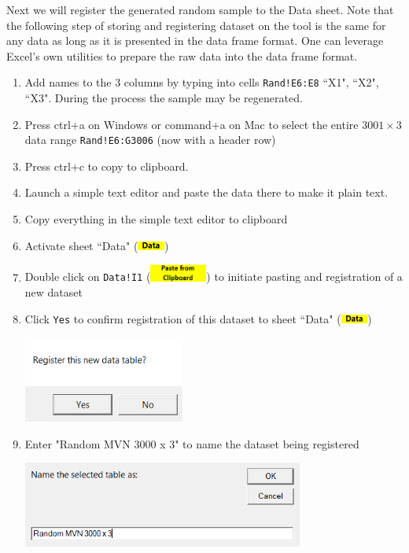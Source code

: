 \documentclass[article]{jss}
\newcommand{\shtData}{``Data" (\includegraphics[height=8pt, keepaspectratio=true]{DataSheetTab_png}) }
\begin{document}
        Next we will register the generated random sample to the Data sheet. Note that the following step of storing and registering dataset on the tool is the same for any data as long as it is presented in the data frame format. One can leverage Excel's own utilities to prepare the raw data into the data frame format.
        \begin{enumerate}
        \item Add names to the 3 columns by typing into cells \texttt{Rand!E6:E8} ``X1", ``X2", ``X3". During the process the sample may be regenerated.
        \item Press ctrl+a on Windows or command+a on Mac to select the entire $3001\times 3$ data range \texttt{Rand!E6:G3006} (now with a header row)
        \item Press ctrl+c to copy to clipboard.
        \item Launch a simple text editor and paste the data there to make it plain text.
        \item Copy everything in the simple text editor to clipboard
        \item Activate sheet \shtData
        \item Double click on \texttt{Data!I1} (\includegraphics[height=16pt,keepaspectratio=true]{DataSheet_PasteFromClipboardButton_png}) to initiate pasting and registration of a new dataset
        \item Click \texttt{Yes} to confirm registration of this dataset to sheet \shtData
        \begin{center}
        \includegraphics[height=80pt, keepaspectratio=true]{DataSheet_ConfirmRegister_png}
        \end{center}
        \item Enter "Random MVN 3000 x 3" to name the dataset being registered
        \begin{center}
        \includegraphics[height=80pt, keepaspectratio=true]{DataSheet_GiveDatasetName_png}

\end{center}
\end{enumerate}
\end{document}
